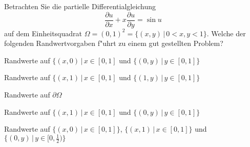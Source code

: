 Betrachten Sie die partielle Differentialgleichung
\[
\frac{\partial u}{\partial x}
+x
\frac{\partial u}{\partial y}
=
\sin u
\]
auf dem Einheitsquadrat $\Omega=(0,1)^2=\{(x,y)\,|\, 0<x,y<1\}$.
Welche der folgenden Randwertvorgaben f"uhrt zu einem gut gestellten
Problem?
\begin{teilaufgaben}
\item
Randwerte auf $\{(x,0)\,|\,x\in [0,1]$ und $\{(0,y)\,|\,y\in[0,1]\}$
\item
Randwerte auf $\{(x,1)\,|\,x\in [0,1]$ und $\{(1,y)\,|\,y\in[0,1]\}$
\item
Randwerte auf $\partial\Omega$
\item
Randwerte auf $\{(x,1)\,|\,x\in [0,1]$ und $\{(0,y)\,|\,y\in[0,1]\}$
\item
Randwerte auf
$\{(x,0)\,|\,x\in [0,1]\}$,
$\{(x,1)\,|\,x\in [0,1]\}$ und 
$\{(0,y)\,|\,y\in[0,\frac12)\}$
\end{teilaufgaben}

